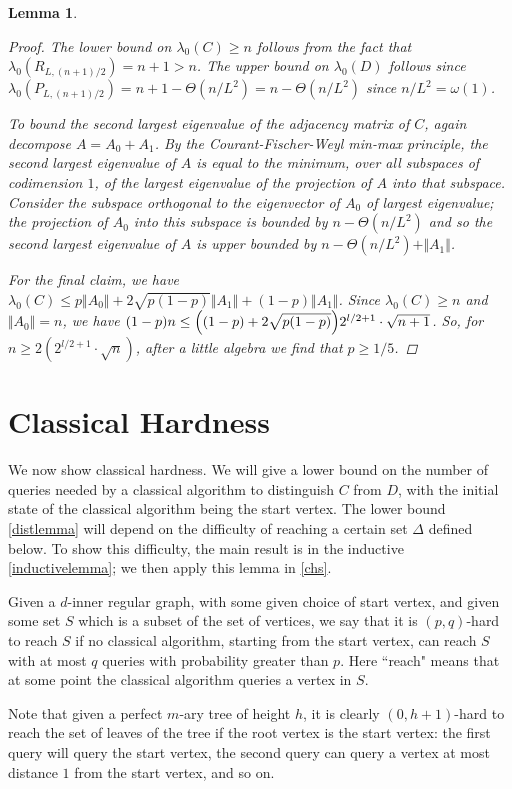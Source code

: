 \documentclass[letterpaper,onecolumn]{quantumarticle}
\newtheorem{lemma}{Lemma}
\newcommand{\glen}{L}
\begin{document}
\begin{lemma}
\begin{proof}
The lower bound on $\lambda_0(C)\geq n$ follows from the fact that $\lambda_0(R_{\glen,(n+1)/2})=n+1>n$.
The upper bound on $\lambda_0(D)$ follows since $\lambda_0(P_{\glen,(n+1)/2})=n+1-\Theta(n/\glen^2)=n-\Theta(n/\glen^2)$ since $n/\glen^2=\omega(1)$.


To bound the second largest eigenvalue of the adjacency matrix of $C$, again decompose $A=A_0+A_1$.
By the Courant-Fischer-Weyl min-max principle, the second largest eigenvalue of $A$  is equal to the minimum, over all subspaces of codimension $1$, of the largest eigenvalue of the projection of $A$ into that subspace.  Consider the subspace orthogonal to the eigenvector of $A_0$ of largest eigenvalue; the projection of $A_0$ into this subspace is bounded by $n-\Theta(n/\glen^2)$ and so
the second largest eigenvalue of $A$ is upper bounded by $n-\Theta(n/\glen^2)+\Vert A_1 \Vert$.

For the final claim, we have $\lambda_0(C) \leq p \Vert A_0 \Vert + 2 \sqrt{p(1-p)} \Vert A_1 \Vert + (1-p) \Vert A_1 \Vert$.
Since $\lambda_0(C)\geq n$ and $\Vert A_0 \Vert=n$, we have
$(1-p) n \leq \Bigl((1-p)+2\sqrt{p(1-p)} \Bigr) 2^{l/2+1} \cdot \sqrt{n+1}$.
So, for $n\geq 2 (2^{l/2+1} \cdot \sqrt{n})$, after a little algebra we find that $p\geq 1/5$.
\end{proof}
\end{lemma}


\section{Classical Hardness}
\label{ch}
We now show classical hardness.  We will give a lower bound on the number of queries needed by a classical algorithm to distinguish $C$ from $D$, with the initial state of the classical algorithm being the start vertex.  The
lower bound \cref{distlemma} will depend on the difficulty of reaching a certain set $\Delta$ defined below.
To show this difficulty,
the main result is in the inductive \cref{inductivelemma}; we then apply this lemma in \cref{chs}.

Given a $d$-inner regular graph, with some given choice of start vertex, and given some set $S$ which is a subset of the set of vertices, we say that it is $(p,q)$-hard to reach $S$ if no classical algorithm, starting from the start vertex, can reach $S$ with at most  $q$ queries with probability greater than $p$.  Here ``reach" means that at some point the classical algorithm queries a vertex in $S$.

Note that given a perfect $m$-ary tree of height $h$, it is clearly $(0,h+1)$-hard to reach the set of leaves of the tree if the root vertex is the start vertex: the first query will query the start vertex, the second query can query a vertex at most distance $1$ from the start vertex, and so on.
\end{document}
